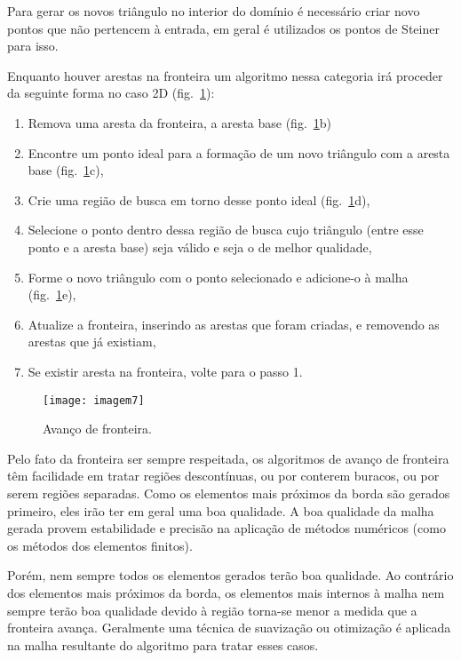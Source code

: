 Para gerar os novos triângulo no interior do domínio é necessário criar novo pontos que não pertencem à entrada, em geral é utilizados os pontos de Steiner para isso.

Enquanto houver arestas na fronteira um algoritmo nessa categoria irá proceder da seguinte forma no caso 2D (fig.~\ref{fig:imagem7}):
 
 \begin{enumerate}
\item{ Remova uma aresta da fronteira, a aresta base (fig.~\ref{fig:imagem7}b)}
\item{ Encontre um ponto ideal para a formação de um novo triângulo com a aresta base (fig.~\ref{fig:imagem7}c),}
\item{ Crie uma região de busca em torno desse ponto ideal (fig.~\ref{fig:imagem7}d),}
\item{ Selecione o ponto dentro dessa região de busca cujo triângulo (entre esse ponto e a aresta base) seja válido e seja o de melhor qualidade,}
\item{ Forme o novo triângulo com o ponto selecionado e adicione-o à malha (fig.~\ref{fig:imagem7}e),}
\item{ Atualize a fronteira, inserindo as arestas que foram criadas, e removendo as arestas que já existiam,}
\item{ Se existir aresta na fronteira, volte para o passo 1.}
\end{enumerate}

 \begin{figure}[htbp]
     \centering
     \texttt{[image: imagem7]}
     \caption{Avanço de fronteira. \cite{bib:Freitas10}} 
     \label{fig:imagem7}
 \end{figure}

 Pelo fato da fronteira ser sempre respeitada, os algoritmos de avanço de fronteira têm facilidade em tratar regiões descontínuas, ou por conterem buracos, ou por serem regiões separadas. Como os elementos mais próximos da borda são gerados primeiro, eles irão ter em geral uma boa qualidade. A boa qualidade da malha gerada provem estabilidade e precisão na aplicação de métodos numéricos (como os métodos dos elementos finitos).

Porém, nem sempre todos os elementos gerados terão boa qualidade. Ao contrário dos elementos mais próximos da borda, os elementos mais internos à malha nem sempre terão boa qualidade devido à região torna-se menor a medida que a fronteira avança. Geralmente uma técnica de suavização ou otimização é aplicada na malha resultante do algoritmo para tratar esses casos.


